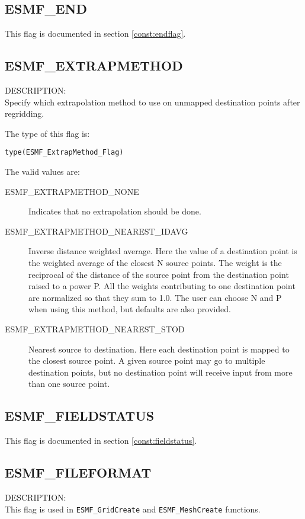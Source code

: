 \subsection{ESMF\_END}

This flag is documented in section \ref{const:endflag}.

\subsection{ESMF\_EXTRAPMETHOD}
\label{opt:extrapmethod}

{\sf DESCRIPTION:\\}  
Specify which extrapolation method to use on unmapped destination points after regridding. 

The type of this flag is:

{\tt type(ESMF\_ExtrapMethod\_Flag)}

The valid values are:
\begin{description}
\item [ESMF\_EXTRAPMETHOD\_NONE]
     Indicates that no extrapolation should be done. 
\item [ESMF\_EXTRAPMETHOD\_NEAREST\_IDAVG]
      Inverse distance weighted average. 
      Here the value of a destination point is the weighted average of the closest N source points. The weight is 
      the reciprocal of the distance of the source point from the destination point raised to a power P. All the
      weights contributing to one destination point are normalized so that they sum to 1.0. 
      The user can choose N and P when using this method, but defaults are also provided.  
\item [ESMF\_EXTRAPMETHOD\_NEAREST\_STOD]
      Nearest source to destination. 
      Here each destination point is mapped to the closest source point. A given source point may go to multiple destination points, but no destination point will receive input from more than one source point. 

\end{description}

\subsection{ESMF\_FIELDSTATUS}
This flag is documented in section \ref{const:fieldstatus}.

\subsection{ESMF\_FILEFORMAT}
\label{const:fileformatflag}
{\sf DESCRIPTION:\\}
This flag is used in {\tt ESMF\_GridCreate} and {\tt ESMF\_MeshCreate} functions. 

